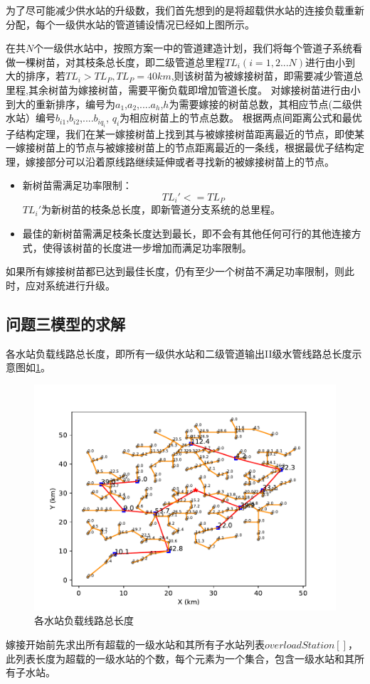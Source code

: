 \documentclass{cumcmthesis}
\begin{document}
    为了尽可能减少供水站的升级数，我们首先想到的是将超载供水站的连接负载重新分配，每个一级供水站的管道铺设情况已经如上图所示。

    在共$N$个一级供水站中，按照方案一中的管道建造计划，我们将每个管道子系统看做一棵树苗，对其枝条总长度，即二级管道总里程$TL_{i}(i=1,2...N)$进行由小到大的排序，若$TL_{i}>TL_{P},TL_{P}=40km$,则该树苗为被嫁接树苗，即需要减少管道总里程,其余树苗为嫁接树苗，需要平衡负载即增加管道长度。
    对嫁接树苗进行由小到大的重新排序，编号为$a_{1}$,$a_{2}$,....$a_{h}$,$h$为需要嫁接的树苗总数，其相应节点(二级供水站）编号$b_{i1}$,$b_{i2}$,....$b_{iq_{i}}$, $q_{i}$为相应树苗上的节点总数。
    根据两点间距离公式和最优子结构定理，我们在某一嫁接树苗上找到其与被嫁接树苗距离最近的节点，即使某一嫁接树苗上的节点与被嫁接树苗上的节点距离最近的一条线，根据最优子结构定理，嫁接部分可以沿着原线路继续延伸或者寻找新的被嫁接树苗上的节点。
  
    \begin{itemize}
    \item 新树苗需满足功率限制：
    $$TL_{i}'<=TL_{P}$$
    $TL_{i}'$为新树苗的枝条总长度，即新管道分支系统的总里程。
    \item 最佳的新树苗需满足枝条长度达到最长，即不会有其他任何可行的其他连接方式，使得该树苗的长度进一步增加而满足功率限制。
    
    \end{itemize}

    如果所有嫁接树苗都已达到最佳长度，仍有至少一个树苗不满足功率限制，则此时，应对系统进行升级。
 
\subsection{问题三模型的求解}
  各水站负载线路总长度，即所有一级供水站和二级管道输出II级水管线路总长度示意图如\cref{fig:pipline_length}。
  \begin{figure}[!h]
    \centering
    \includegraphics[width=.8\textwidth]{figure/pipline_length.pdf}
    \caption{各水站负载线路总长度}
    \label{fig:pipline_length}
  \end{figure}
  嫁接开始前先求出所有超载的一级水站和其所有子水站列表$overloadStation[]$，此列表长度为超载的一级水站的个数，每个元素为一个集合，包含一级水站和其所有子水站。
\end{document}
